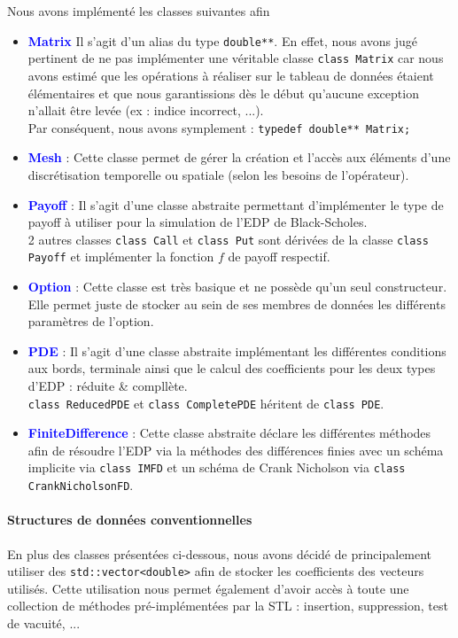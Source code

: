 \documentclass[11pt,a4paper]{article}
\theoremstyle{plain}
\begin{document}
Nous avons implémenté les classes  suivantes afin
\begin{itemize}
    \item \textbf{\textcolor{blue}{Matrix}} Il s'agit d'un alias du type \texttt{double**}. En effet, nous avons jugé pertinent de ne pas implémenter une véritable classe \texttt{class Matrix} car nous avons estimé que les opérations à réaliser sur le tableau de données étaient élémentaires et que nous garantissions dès le début qu'aucune exception n'allait être levée (ex : indice incorrect, ...).
    \\ Par conséquent, nous avons symplement : \texttt{typedef double** Matrix;}
    \item \textbf{\textcolor{blue}{Mesh}} : Cette classe permet de gérer la création et l'accès aux éléments d'une discrétisation temporelle ou spatiale (selon les besoins de l'opérateur).
    \item \textbf{\textcolor{blue}{Payoff}} : Il s'agit d'une classe abstraite permettant d'implémenter le type de payoff à utiliser pour la simulation de l'EDP de Black-Scholes.
    \\
    2 autres classes \texttt{class Call} et \texttt{class Put} sont dérivées de la classe \texttt{class Payoff} et implémenter la fonction $f$ de payoff respectif.
    \item \textbf{\textcolor{blue}{Option}} : Cette classe est très basique et ne possède qu'un seul constructeur. Elle permet juste de stocker au sein de ses membres de données les différents paramètres de l'option.
    
    \item \textbf{\textcolor{blue}{PDE}} : Il s'agit d'une classe abstraite implémentant les différentes conditions aux bords, terminale ainsi que le calcul des coefficients pour les deux types d'EDP : réduite \& compllète.
    \\
    \texttt{class ReducedPDE} et \texttt{class CompletePDE} héritent de \texttt{class PDE}.
    \item \textbf{\textcolor{blue}{FiniteDifference}} : Cette classe abstraite déclare les différentes méthodes afin de résoudre l'EDP via la méthodes des différences finies avec un schéma implicite via \texttt{class IMFD} et un schéma de Crank Nicholson via \texttt{class CrankNicholsonFD}. 
\end{itemize}

\paragraph{Structures de données conventionnelles} En plus des classes présentées ci-dessous, nous avons décidé de principalement utiliser des \texttt{std::vector<double>} afin de stocker les coefficients des vecteurs utilisés.
Cette utilisation nous permet également d'avoir accès à toute une collection de méthodes pré-implémentées par la STL : insertion, suppression, test de vacuité, ...
\end{document}
